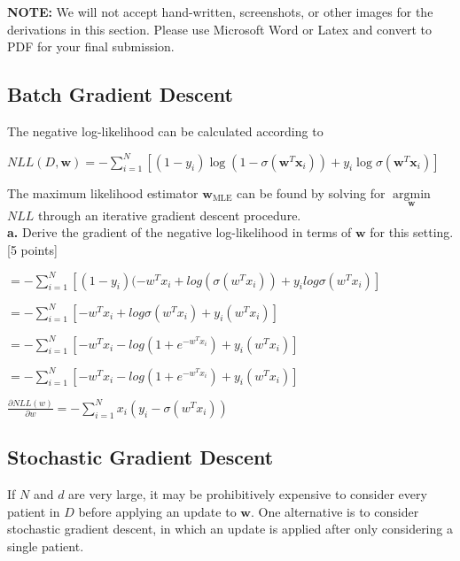 \documentclass[12pt]{article}
\begin{document}
\textbf{NOTE:} We will not accept hand-written, screenshots, or other images for the derivations in this section. Please use Microsoft Word or Latex and convert to PDF for your final submission.

\subsection{Batch Gradient Descent}


The negative log-likelihood can be calculated according to
\begin{center}
$NLL\left (D, \mathbf{w} \right ) = -\sum_{i=1}^{N} \left [ \left ( 1 - y_i \right ) \log(1-\sigma(\mathbf{w}^T\mathbf{x}_i)) + y_i\log \sigma(\mathbf{w}^T\mathbf{x}_i)  \right ]$ \end{center}
The maximum likelihood estimator $\mathbf{w}_{\text{MLE}}$ can be found by solving for $\underset{\mathbf{w}}{\operatorname{arg\min}}$ $NLL$ through an iterative gradient descent procedure.\\

\textbf{a.} Derive the gradient of the negative log-likelihood in terms of $\mathbf{w}$ for this setting. [5 points] 


\vspace{5mm}


$ = -\sum_{i=1}^{N} [(1-y_{i})(-w^T x_{i} + log(\sigma(w^Tx_{i})) + y_{i} log \sigma (w^Tx_{i})]$


\vspace{5mm}

$ = -\sum_{i=1}^{N} [-w^T x_{i} + log \sigma(w^Tx_{i}) + y_{i} (w^Tx_{i})]$

\vspace{5mm}

$ = -\sum_{i=1}^{N} [-w^T x_{i} - log (1 + e^{-w^Tx_{i}}) + y_{i} (w^Tx_{i})]$

\vspace{5mm}

$ = -\sum_{i=1}^{N} [-w^T x_{i} - log (1 + e^{-w^Tx_{i}}) + y_{i} (w^Tx_{i})]$

\vspace{5mm}

$ \frac{\partial NLL(w)}{\partial w} = -\sum_{i=1}^{N}x_{i}(y_{i} - \sigma(w^T x_{i}))$

\vspace{5mm}


\subsection{Stochastic Gradient Descent}
If $N$ and $d$ are very large, it may be prohibitively expensive to consider every patient in $D$ before applying an update to $\mathbf{w}$. One alternative is to consider stochastic gradient descent, in which an update is applied after only considering a single patient. \\
\end{document}
